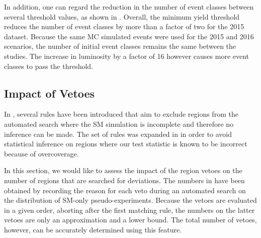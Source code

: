 In addition, one can regard the reduction in the number of event classes between several threshold values, as shown in . Overall, the minimum yield threshold reduces the number of event classes by more than a factor of two for the 2015 dataset. Because the same \ac{MC} simulated events were used for the 2015 and 2016 scenarios, the number of initial event classes remains the same between the studies. The increase in luminosity by a factor of \num{16} however causes more event classes to pass the threshold.

\subsection{Impact of Vetoes}
In , several rules have been introduced that aim to exclude regions from the automated search where the \ac{SM} simulation is incomplete and therefore no inference can be made. The set of rules was expanded in  in order to avoid statistical inference on regions where our test statistic is known to be incorrect because of overcoverage.

In this section, we would like to assess the impact of the region vetoes on the number of regions that are searched for deviations. 
The numbers in  have been obtained by recording the reason for each veto during an automated search on the \sumpT distribution of \ac{SM}-only pseudo-experiments. Because the vetoes are evaluated in a given order, aborting after the first matching rule, the numbers on the latter vetoes are only an approximation and a lower bound. The total number of vetoes, however, can be accurately determined using this feature.

